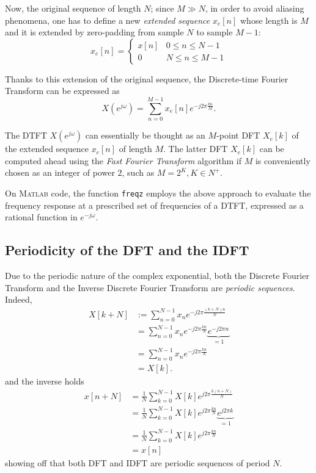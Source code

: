 \documentclass[\documentfontsize, twocolumn]{\classname}
\begin{document}
Now, the original sequence of length $N$; since $M\gg N$, in order to avoid aliasing phenomena, one has to define a new \emph{extended sequence} $x_e[n]$ whose length is $M$ and it is extended by zero-padding from sample $N$ to sample $M-1$:
\[
    x_e[n] =
\left\{
    \begin{array}{ll}
        x[n] & 0 \leq n \leq N-1\\
        0 & N \leq n \leq M-1
    \end{array}
\right.
\]

Thanks to this extension of the original sequence, the Discrete-time Fourier Transform can be expressed as
\[
    X(e^{j\omega}) = \sum_{n=0}^{M-1} x_e[n] e^{-j2\pi \frac{kn}{M}}.
\]

The DTFT $X(e^{j\omega})$ can essentially be thought as an $M$-point DFT $X_e[k]$ of the extended sequence $x_e[n]$ of length $M$. The latter DFT $X_e[k]$ can be computed ahead using the \emph{Fast Fourier Transform} algorithm if $M$ is conveniently chosen as an integer of power $2$, such as $M = 2^K, K \in N^+$.

On \textsc{Matlab} code, the function \texttt{freqz} employs the above approach to evaluate the frequency response at a prescribed set of frequencies of a DTFT, expressed as a rational function in $e^{-j\omega}$.

\subsection{Periodicity of the DFT and the IDFT}

Due to the periodic nature of the complex exponential, both the Discrete Fourier Transform and the Inverse Discrete Fourier Transform are \emph{periodic sequences}. Indeed,
\begin{align*}
    X[k+N]
    &:= \sum_{n=0}^{N-1} x_n e^{-j2\pi\frac{(k+N)n}{N}} \\
    &= \sum_{n=0}^{N-1} x_n e^{-j2\pi\frac{kn}{N}}\underbrace{e^{-j2\pi n}}_{=1} \\
    &= \sum_{n=0}^{N-1} x_n e^{-j2\pi\frac{kn}{N}}\\
    &= X[k].
\end{align*}
and the inverse holds
\begin{align*}
    x[n+N]
    &= \frac 1 N \sum_{k=0}^{N-1}X[k] e^{j2\pi \frac{k(n+N)}{N}}\\
    &= \frac 1 N \sum_{k=0}^{N-1}X[k] e^{j2\pi \frac{kn}{N}}\underbrace{e^{j2\pi k}}_{=1}\\
    &= \frac 1 N \sum_{k=0}^{N-1}X[k] e^{j2\pi \frac{kn}{N}}\\
    &= x[n]
\end{align*}
showing off that both DFT and IDFT are periodic sequences of period $N$.
\end{document}
